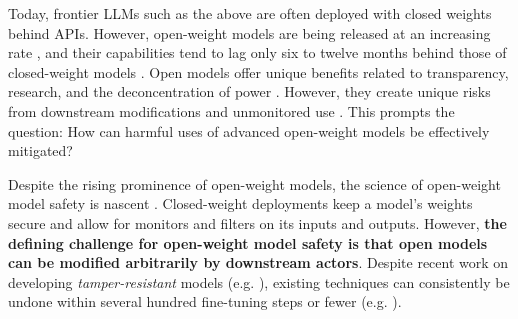 
Today, frontier LLMs such as the above are often deployed with closed weights behind APIs.
However, open-weight models are being released at an increasing rate \citep{bhandari2025forecasting}, and their capabilities tend to lag only six to twelve months behind those of closed-weight models \citep{epoch2024openmodelsreport, maslej2024artificial}.
Open models offer unique benefits related to transparency, research, and the deconcentration of power \citep{bommasani2024considerations, kapoor2024societal, eiras2024risks, françois2025differentapproachaisafety}. 
However, they create unique risks from downstream modifications and unmonitored use \citep{seger2023open, chan2023hazards, huang2024harmful, eiras2024risks}. 
This prompts the question: How can harmful uses of advanced open-weight models be effectively mitigated?

Despite the rising prominence of open-weight models, the science of open-weight model safety is nascent \citep{françois2025differentapproachaisafety, pai2024risk}. 
Closed-weight deployments keep a model's weights secure and allow for monitors and filters on its inputs and outputs.
However, \textbf{the defining challenge for open-weight model safety is that open models can be modified arbitrarily by downstream actors}.
Despite recent work on developing \textit{tamper-resistant} models (e.g. \citealp{henderson2023self, rosati2024representation, tamirisa2408tamper, sheshadri2024latent}), existing techniques can consistently be undone within several hundred fine-tuning steps or fewer (e.g. \citealp{qi2024evaluating, huang2025virus, che2025model, fan2025towards, hu2024jogging, sheshadri2024latent, lucki2024adversarial, qian2025layered, deeb2024unlearning}).


